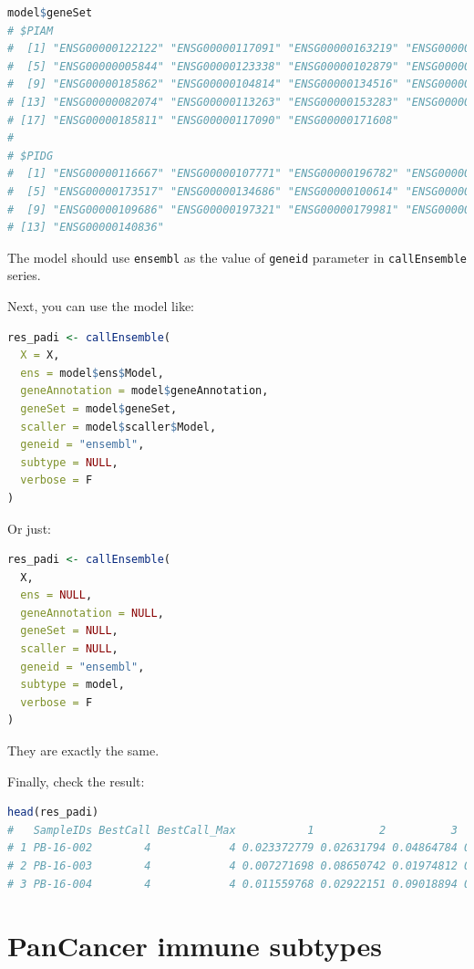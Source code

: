 \documentclass[
  12pt,
]{book}
\newcommand{\passthrough}[1]{#1}
\begin{document}
\begin{lstlisting}[language=R]
model$geneSet
# $PIAM
#  [1] "ENSG00000122122" "ENSG00000117091" "ENSG00000163219" "ENSG00000136167"
#  [5] "ENSG00000005844" "ENSG00000123338" "ENSG00000102879" "ENSG00000010671"
#  [9] "ENSG00000185862" "ENSG00000104814" "ENSG00000134516" "ENSG00000100055"
# [13] "ENSG00000082074" "ENSG00000113263" "ENSG00000153283" "ENSG00000198821"
# [17] "ENSG00000185811" "ENSG00000117090" "ENSG00000171608"
# 
# $PIDG
#  [1] "ENSG00000116667" "ENSG00000107771" "ENSG00000196782" "ENSG00000271447"
#  [5] "ENSG00000173517" "ENSG00000134686" "ENSG00000100614" "ENSG00000134247"
#  [9] "ENSG00000109686" "ENSG00000197321" "ENSG00000179981" "ENSG00000187189"
# [13] "ENSG00000140836"
\end{lstlisting}

The model should use \passthrough{\lstinline!ensembl!} as the value of \passthrough{\lstinline!geneid!} parameter in \passthrough{\lstinline!callEnsemble!} series.

Next, you can use the model like:

\begin{lstlisting}[language=R]
res_padi <- callEnsemble(
  X = X,
  ens = model$ens$Model,
  geneAnnotation = model$geneAnnotation,
  geneSet = model$geneSet,
  scaller = model$scaller$Model,
  geneid = "ensembl",
  subtype = NULL,
  verbose = F
)
\end{lstlisting}

Or just:

\begin{lstlisting}[language=R]
res_padi <- callEnsemble(
  X,
  ens = NULL,
  geneAnnotation = NULL,
  geneSet = NULL,
  scaller = NULL,
  geneid = "ensembl",
  subtype = model, 
  verbose = F
)
\end{lstlisting}

They are exactly the same.

Finally, check the result:

\begin{lstlisting}[language=R]
head(res_padi)
#   SampleIDs BestCall BestCall_Max           1          2          3         4
# 1 PB-16-002        4            4 0.023372779 0.02631794 0.04864784 0.3336484
# 2 PB-16-003        4            4 0.007271698 0.08650742 0.01974812 0.9530730
# 3 PB-16-004        4            4 0.011559768 0.02922151 0.09018894 0.8649045
\end{lstlisting}

\hypertarget{pancancer-immune-subtypes}{%
\section{PanCancer immune subtypes}\label{pancancer-immune-subtypes}}
\end{document}
